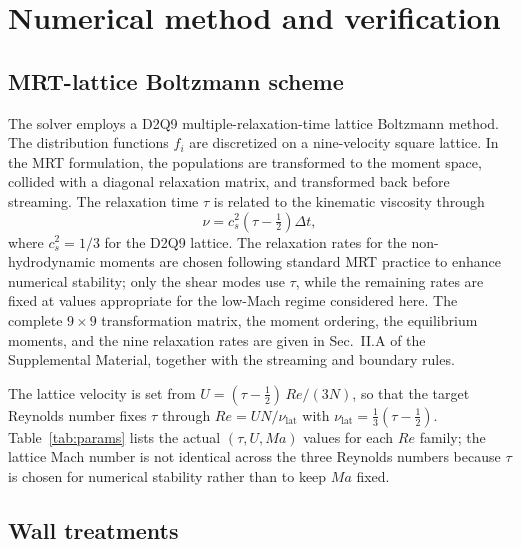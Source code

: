 \section{Numerical method and verification}
\label{sec:numerical}

\subsection{MRT-lattice Boltzmann scheme}
\label{subsec:mrt}

The solver employs a D2Q9 multiple-relaxation-time lattice Boltzmann method. The distribution functions $f_i$ are discretized on a nine-velocity square lattice. In the MRT formulation, the populations are transformed to the moment space, collided with a diagonal relaxation matrix, and transformed back before streaming. The relaxation time $\tau$ is related to the kinematic viscosity through
\begin{equation}
\nu = c_s^2\left(\tau - \tfrac{1}{2}\right)\Delta t,
\end{equation}
where $c_s^2 = 1/3$ for the D2Q9 lattice. The relaxation rates for the non-hydrodynamic moments are chosen following standard MRT practice to enhance numerical stability; only the shear modes use $\tau$, while the remaining rates are fixed at values appropriate for the low-Mach regime considered here. The complete $9\times9$ transformation matrix, the moment ordering, the equilibrium moments, and the nine relaxation rates are given in Sec.~II.A of the Supplemental Material, together with the streaming and boundary rules.

The lattice velocity is set from $U=(\tau-\tfrac12)\,Re/(3N)$, so that the target Reynolds number fixes $\tau$ through $Re=UN/\nu_{\mathrm{lat}}$ with $\nu_{\mathrm{lat}}=\tfrac13(\tau-\tfrac12)$. Table~\ref{tab:params} lists the actual $(\tau,U,Ma)$ values for each $Re$ family; the lattice Mach number is not identical across the three Reynolds numbers because $\tau$ is chosen for numerical stability rather than to keep $Ma$ fixed.

\subsection{Wall treatments}
\label{subsec:walls}

